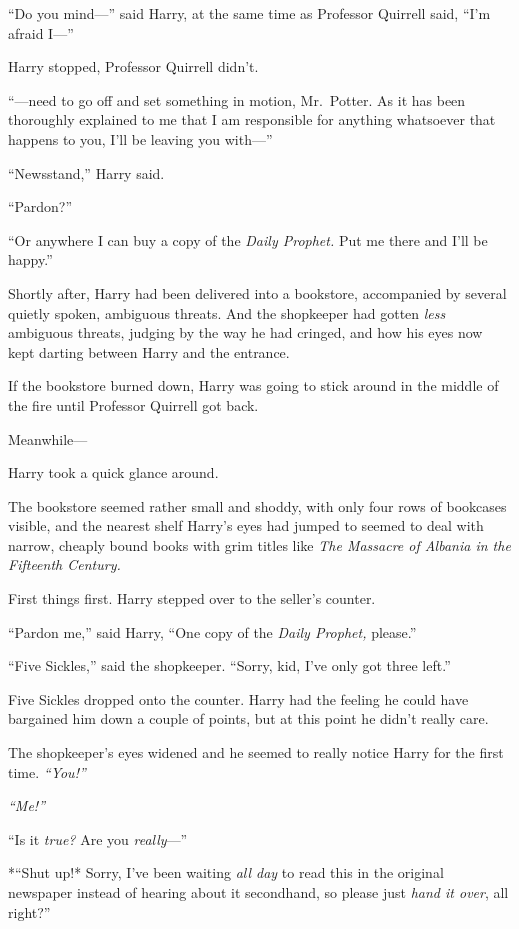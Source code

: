 ``Do you mind---'' said Harry, at the same time as Professor Quirrell
said, ``I'm afraid I---''

Harry stopped, Professor Quirrell didn't.

``---need to go off and set something in motion, Mr.~Potter. As it has
been thoroughly explained to me that I am responsible for anything
whatsoever that happens to you, I'll be leaving you with---''

``Newsstand,'' Harry said.

``Pardon?''

``Or anywhere I can buy a copy of the \emph{Daily Prophet.} Put me there
and I'll be happy.''

Shortly after, Harry had been delivered into a bookstore, accompanied by
several quietly spoken, ambiguous threats. And the shopkeeper had gotten
\emph{less} ambiguous threats, judging by the way he had cringed, and
how his eyes now kept darting between Harry and the entrance.

If the bookstore burned down, Harry was going to stick around in the
middle of the fire until Professor Quirrell got back.

Meanwhile---

Harry took a quick glance around.

The bookstore seemed rather small and shoddy, with only four rows of
bookcases visible, and the nearest shelf Harry's eyes had jumped to
seemed to deal with narrow, cheaply bound books with grim titles like
\emph{The Massacre of Albania in the Fifteenth Century.}

First things first. Harry stepped over to the seller's counter.

``Pardon me,'' said Harry, ``One copy of the \emph{Daily Prophet,}
please.''

``Five Sickles,'' said the shopkeeper. ``Sorry, kid, I've only got three
left.''

Five Sickles dropped onto the counter. Harry had the feeling he could
have bargained him down a couple of points, but at this point he didn't
really care.

The shopkeeper's eyes widened and he seemed to really notice Harry for
the first time. \emph{``You!''}

\emph{``Me!''}

``Is it \emph{true?} Are you \emph{really}---''

*``Shut up!* Sorry, I've been waiting \emph{all day} to read this in the
original newspaper instead of hearing about it secondhand, so please
just \emph{hand it over}, all right?''

